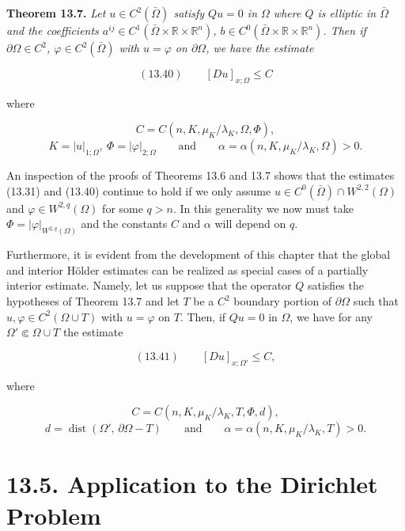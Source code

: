 \begin{theorem}\label{thm:gt13-holder-gradient-13-7}
\textbf{Theorem 13.7.} \textit{Let $u \in C^2(\bar{\Omega})$ satisfy $Qu=0$ in $\Omega$ where $Q$ is elliptic in $\bar{\Omega}$ and the
coefficients $a^{ij} \in C^1(\bar{\Omega}\times \mathbb{R}\times \mathbb{R}^n)$, $b \in C^0(\bar{\Omega}\times \mathbb{R}\times \mathbb{R}^n)$. Then if $\partial \Omega \in C^2$, $\varphi \in C^2(\bar{\Omega})$
with $u=\varphi$ on $\partial \Omega$, we have the estimate}
\end{theorem}

\begin{equation}
(13.40)\qquad [Du]_{x;\Omega}\leq C
\end{equation}

where

\[
C=C(n,K,\mu_K/\lambda_K,\Omega,\Phi),
\]
\[
K=|u|_{1;\Omega},\ \Phi=|\varphi|_{2;\Omega}\qquad \text{and}\qquad \alpha=\alpha(n,K,\mu_K/\lambda_K,\Omega)>0.
\]

An inspection of the proofs of Theorems 13.6 and 13.7 shows that the estimates
(13.31) and (13.40) continue to hold if we only assume $u \in C^0(\bar{\Omega}) \cap W^{2,2}(\Omega)$ and
$\varphi \in W^{2,q}(\Omega)$ for some $q>n$. In this generality we now must take $\Phi=|\varphi|_{W^{2,q}(\Omega)}$ and
the constants $C$ and $\alpha$ will depend on $q$.

Furthermore, it is evident from the development of this chapter that the global
and interior H\"older estimates can be realized as special cases of a partially interior
estimate. Namely, let us suppose that the operator $Q$ satisfies the hypotheses of
Theorem 13.7 and let $T$ be a $C^2$ boundary portion of $\partial \Omega$ such that $u,\varphi \in C^2(\Omega\cup T)$
with $u=\varphi$ on $T$. Then, if $Qu=0$ in $\Omega$, we have for any $\Omega' \Subset \Omega\cup T$ the estimate

\begin{equation}
(13.41)\qquad [Du]_{x;\Omega'}\leq C,
\end{equation}

where

\[
C=C(n,K,\mu_K/\lambda_K,T,\Phi,d),
\]
\[
d=\operatorname{dist}(\Omega',\,\partial \Omega - T)\qquad \text{and}\qquad \alpha=\alpha(n,K,\mu_K/\lambda_K,T)>0.
\]

\section*{13.5. Application to the Dirichlet Problem}

